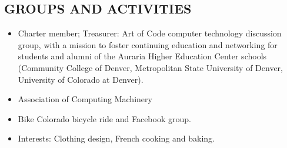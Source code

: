 \documentclass[line,margin]{res}
\begin{document}
\begin{resume}
\section{GROUPS AND ACTIVITIES}        
\begin{itemize}   %
          \item Charter member; Treasurer: Art of Code computer technology discussion group, with a mission to foster continuing education and networking for students and alumni of the Auraria Higher Education Center schools (Community College of Denver, Metropolitan State University of Denver, University of Colorado at Denver).
\item	Association of Computing Machinery
\item Bike Colorado bicycle ride and Facebook group.
\item Interests: Clothing design, French cooking and baking.
\end{itemize}
 

\end{resume}
\end{document}
